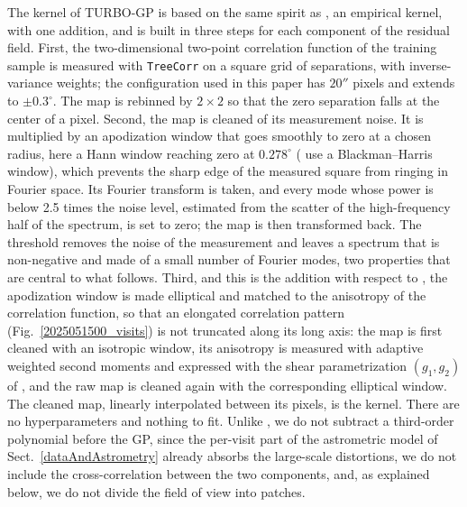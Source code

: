 The kernel of TURBO-GP is based on the same spirit as , an empirical kernel, with one addition, and is built in three steps 
for each component of the residual field.
First, the two-dimensional two-point correlation function of the training sample is measured with \texttt{TreeCorr} on a square grid of separations, 
with inverse-variance weights; the configuration used in this paper has $20''$ pixels and extends to $\pm 0.3^\circ$.
The map is rebinned by $2 \times 2$ so that the zero separation falls at the center of a pixel.
Second, the map is cleaned of its measurement noise.
It is multiplied by an apodization window that goes smoothly to zero at a chosen radius, here a Hann window reaching 
zero at $0.278^\circ$ ( use a Blackman--Harris window), which prevents the sharp edge of the 
measured square from ringing in Fourier space.
Its Fourier transform is taken, and every mode whose power is below 2.5 times the noise level, estimated from the scatter of the 
high-frequency half of the spectrum, is set to zero; the map is then transformed back.
The threshold removes the noise of the measurement and leaves a spectrum that is non-negative and made of a small number of Fourier modes, 
two properties that are central to what follows.
Third, and this is the addition with respect to , the apodization window is made elliptical and matched to 
the anisotropy of the correlation function, so that an elongated correlation pattern (Fig.~\ref{2025051500_visits}) is not truncated along 
its long axis: the map is first cleaned with an isotropic window, its anisotropy is measured with adaptive weighted 
second moments \citep{2003MNRAS.343..459H, 2005MNRAS.361.1287M} and expressed with the shear 
parametrization $(g_1, g_2)$ of , and the raw map is cleaned again with the corresponding elliptical window.
The cleaned map, linearly interpolated between its pixels, is the kernel.
There are no hyperparameters and nothing to fit.
Unlike , we do not subtract a third-order polynomial before the GP, since the per-visit part of the 
astrometric model of Sect.~\ref{dataAndAstrometry} already absorbs the large-scale distortions, we do not include the cross-correlation between 
the two components, and, as explained below, we do not divide the field of view into patches.


